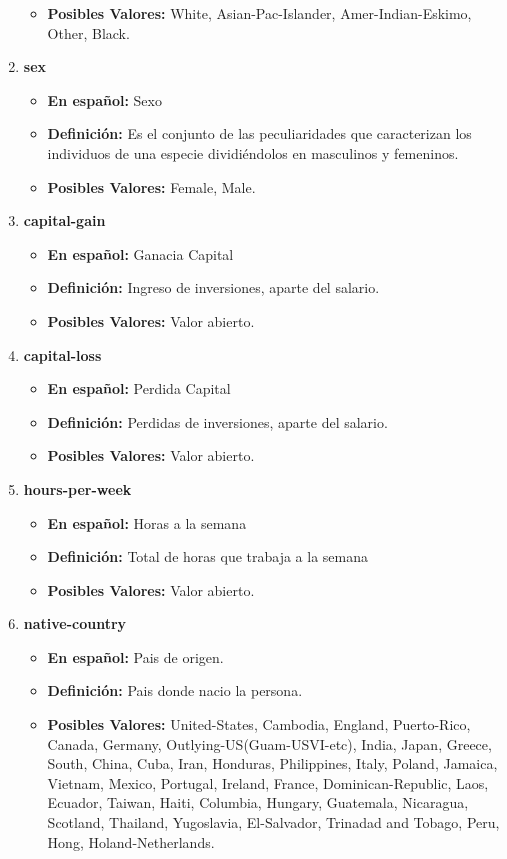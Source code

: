\documentclass{article}
\begin{document}
\begin{enumerate}
\begin{itemize}
       \item \textbf{Posibles Valores:} White, Asian-Pac-Islander, Amer-Indian-Eskimo, Other, Black.
     \end{itemize}
     \item \textbf{sex}
     \begin{itemize}
       \item \textbf{En español:} Sexo
       \item \textbf{Definición:} Es el conjunto de las peculiaridades que caracterizan los individuos de una especie dividiéndolos en masculinos y femeninos.
       \item \textbf{Posibles Valores:} Female, Male.
     \end{itemize}
     \item \textbf{capital-gain}
     \begin{itemize}
       \item \textbf{En español:} Ganacia Capital
       \item \textbf{Definición:} Ingreso de inversiones, aparte del salario.
       \item \textbf{Posibles Valores:} Valor abierto.
     \end{itemize}
     \item \textbf{capital-loss}
     \begin{itemize}
       \item \textbf{En español:} Perdida Capital
       \item \textbf{Definición:} Perdidas de inversiones, aparte del salario.
       \item \textbf{Posibles Valores:} Valor abierto.
     \end{itemize}
     \item \textbf{hours-per-week}
     \begin{itemize}
       \item \textbf{En español:} Horas a la semana
       \item \textbf{Definición:} Total de horas que trabaja a la semana
       \item \textbf{Posibles Valores:} Valor abierto.
     \end{itemize}
     \item \textbf{native-country}
     \begin{itemize}
       \item \textbf{En español:} Pais de origen.
       \item \textbf{Definición:} Pais donde nacio la persona.
       \item \textbf{Posibles Valores:}  United-States, Cambodia, England, Puerto-Rico, Canada, Germany, Outlying-US(Guam-USVI-etc), India, Japan, Greece, South, China, Cuba, Iran, Honduras, Philippines, Italy, Poland, Jamaica, Vietnam, Mexico, Portugal, Ireland, France, Dominican-Republic, Laos, Ecuador, Taiwan, Haiti, Columbia, Hungary, Guatemala, Nicaragua, Scotland, Thailand, Yugoslavia, El-Salvador, Trinadad and Tobago, Peru, Hong, Holand-Netherlands.
     \end{itemize}
   \end{enumerate}
\end{document}
